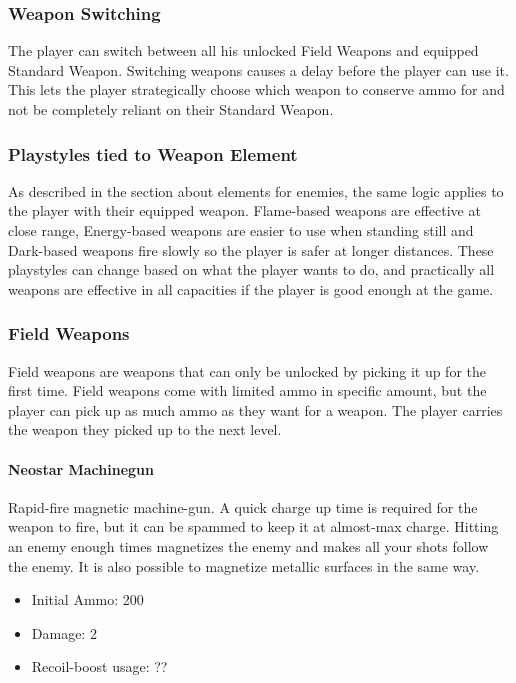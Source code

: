 \documentclass[12pt]{article}
\begin{document}
\subsubsection{Weapon Switching}

The player can switch between all his unlocked Field Weapons and equipped Standard Weapon. Switching weapons causes a delay before the player can use it. This lets the player strategically choose which weapon to conserve ammo for and not be completely reliant on their Standard Weapon. 

\subsubsection{Playstyles tied to Weapon Element}

As described in the section about elements for enemies, the same logic applies to the player with their equipped weapon. Flame-based  weapons are effective at close range, Energy-based weapons are easier to use when standing still and Dark-based weapons fire slowly so the player is safer at longer distances. These playstyles can change based on what the player wants to do, and practically all weapons are effective in all capacities if the player is good enough at the game. 

\subsubsection{Field Weapons}

Field weapons are weapons that can only be unlocked by picking it up for the first time. Field weapons come with limited ammo in specific amount, but the player can pick up as much ammo as they want for a weapon. The player carries the weapon they picked up to the next level. 

\paragraph{Neostar Machinegun}

Rapid-fire magnetic machine-gun. A quick charge up time is required for the weapon to fire, but it can be spammed to keep it at almost-max charge. Hitting an enemy enough times magnetizes the enemy and makes all your shots follow the enemy. It is also possible to magnetize metallic surfaces in the same way.

\begin{itemize}
	\item Initial Ammo: 200
	\item Damage: 2
	\item Recoil-boost usage: ??
\end{itemize}
\end{document}
